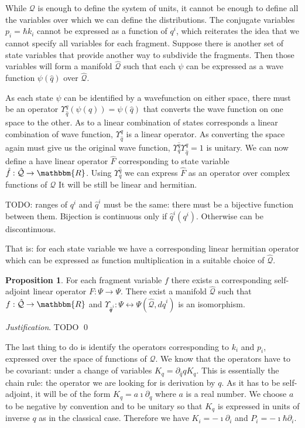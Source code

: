 \documentclass[aps,pra,10pt,twocolumn,floatfix,nofootinbib]{revtex4-1}
\numberwithin{equation}{section}
\theoremstyle{definition}
\newtheorem{prop}[equation]{Proposition}
\newenvironment{justification}{\emph{Justification}.}{\qed}
\begin{document}
While $\mathcal{Q}$ is enough to define the system of units, it cannot be enough to define all the variables over which we can define the distributions. The conjugate variables $p_i=\hbar k_i$ cannot be expressed as a function of $q^i$, which reiterates the idea that we cannot specify all variables for each fragment. Suppose there is another set of state variables that provide another way to subdivide the fragments. Then those variables will form a manifold $\hat{\mathcal{Q}}$ such that each $\psi$ can be expressed as a wave function $\psi(\hat{q})$ over $\hat{\mathcal{Q}}$.

As each state $\psi$ can be identified by a wavefunction on either space, there must be an operator $\Upsilon^q_{\hat{q}}(\psi(q)) = \psi(\hat{q})$ that converts the wave function on one space to the other. As to a linear combination of states corresponds a linear combination of wave function, $\Upsilon^q_{\hat{q}}$ is a linear operator. As converting the space again must give us the original wave function, $\Upsilon^{\hat{q}}_{q} \Upsilon^q_{\hat{q}}= 1$ is unitary. We can now define a have linear operator $\hat{F}$ corresponding to state variable $\hat{f} : \hat{\mathcal{Q}} \rightarrow \mathbbm{R}$. Using $\Upsilon^{\hat{q}}_{q}$ we can express $\hat{F}$ as an operator over complex functions of $\mathcal{Q}$ It will be still be linear and hermitian.

TODO: ranges of $q^i$ and $\hat{q}^i$ must be the same: there must be a bijective function between them. Bijection is continuous only if $\hat{q}^i(q^i)$. Otherwise can be discontinuous.

That is: for each state variable we have a corresponding linear hermitian operator which can be expressed as function multiplication in a suitable choice of $\hat{\mathcal{Q}}$.

\begin{prop}\label{prop:self_adjoint_operators}
	For each fragment variable $f$ there exists a corresponding self-adjoint linear operator $F : \Psi \rightarrow \Psi$. There exist a manifold $\hat{\mathcal{Q}}$ such that $f : \hat{\mathcal{Q}} \rightarrow \mathbbm{R}$ and $\Upsilon_{\hat{\mathcal{q}}^i} : \Psi \leftrightarrow \Psi(\hat{\mathcal{Q}}, d\hat{q}^i)$ is an isomorphism.
\end{prop}
\begin{justification}
	TODO
\end{justification}

The last thing to do is identify the operators corresponding to $k_i$ and $p_i$, expressed over the space of functions of $\mathcal{Q}$. We know that the operators have to be covariant: under a change of variables $K_{\hat{q}} = \partial_{\hat{q}} q K_{q}$. This is essentially the chain rule: the operator we are looking for is derivation by $q$. As it has to be self-adjoint, it will be of the form $K_{q} = a \imath \partial_q$ where $a$ is a real number. We choose $a$ to be negative by convention and to be unitary so that $K_{q}$ is expressed in units of inverse $q$ as in the classical case. Therefore we have $K_{i} = -\imath \partial_i$ and $P_{i} = -\imath \hbar \partial_i$.
\end{document}
